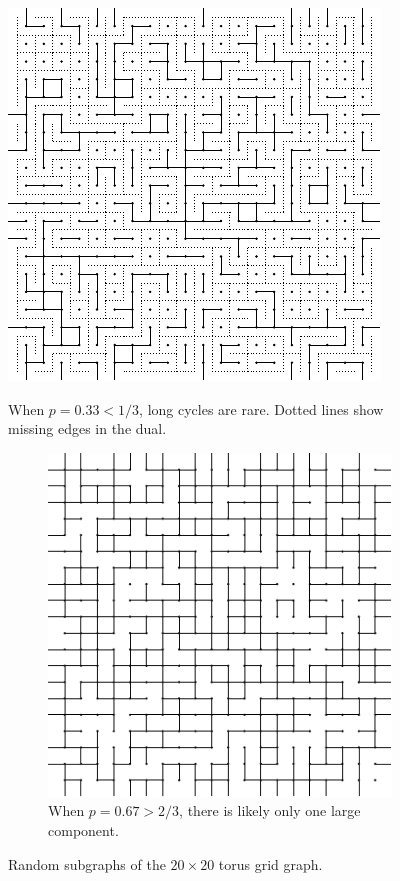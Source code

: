 \documentclass[prodmode,acmcsur]{acmsmall}
\begin{document}
\begin{figure}
  \centering
    \includegraphics{torusrare}
    \caption{When $p = 0.33 < 1/3$, long cycles are rare. Dotted lines show
      missing edges in the dual.}
  \quad\quad
  \begin{subfigure}[t]{0.4\textwidth}
    \includegraphics{torusdense}
    \caption{When $p = 0.67 > 2/3$, there is likely only one large
      component.}
  \end{subfigure}
  \caption{Random subgraphs of the $20 \times 20$ torus grid graph.}
\end{figure}
\end{document}
